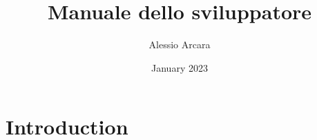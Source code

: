 \documentclass{article}
\title{Manuale dello sviluppatore}
\author{Alessio Arcara}
\date{January 2023}
\begin{document}
%    

    \maketitle


    \section{Introduction}
\end{document}

